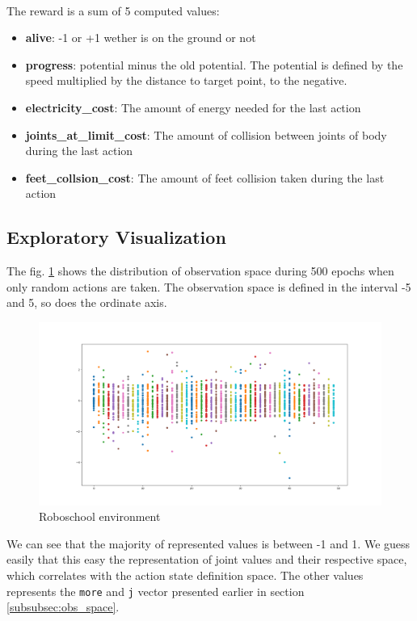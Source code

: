 \documentclass{article}
\begin{document}
\paragraph{}
The reward is a sum of 5 computed values: \begin{itemize}
  \item{\textbf{alive}: -1 or +1 wether is on the ground or not}
  \item{\textbf{progress}: potential minus the old potential. The potential is defined by
    the speed multiplied by the distance to target point, to the negative.}
  \item{\textbf{electricity\_cost}: The amount of energy needed for the last action}
  \item{\textbf{joints\_at\_limit\_cost}: The amount of collision between joints of body
      during the last action}
  \item{\textbf{feet\_collsion\_cost}: The amount of feet collision taken during the last action}
  \end{itemize}

\subsection{Exploratory Visualization}

The fig. \ref{fig:exploratory} shows the distribution of observation
space during 500 epochs when only random actions are taken. The observation
space is defined in the interval -5 and 5, so does the ordinate axis.

\begin{figure}[ht]
  \centering
  \includegraphics[width=\textwidth]{exploratory}
  \caption{Roboschool environment}
  \label{fig:exploratory}
\end{figure}

We can see that the majority of represented values is between -1 and 1. We guess
easily that this easy the representation of joint values and their respective
space, which correlates with the action state definition space. The other values
represents the \verb?more? and \verb?j? vector presented earlier in section
\ref{subsubsec:obs_space}.
\end{document}
